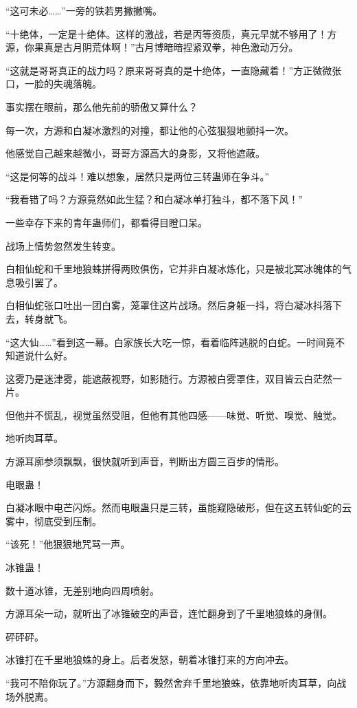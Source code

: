 \begin{this_body}
“这可未必……”一旁的铁若男撇撇嘴。

“十绝体，一定是十绝体。这样的激战，若是丙等资质，真元早就不够用了！方源，你果真是古月阴荒体啊！”古月博暗暗捏紧双拳，神色激动万分。

“这就是哥哥真正的战力吗？原来哥哥真的是十绝体，一直隐藏着！”方正微微张口，一脸的失魂落魄。

事实摆在眼前，那么他先前的骄傲又算什么？

每一次，方源和白凝冰激烈的对撞，都让他的心弦狠狠地颤抖一次。

他感觉自己越来越微小，哥哥方源高大的身影，又将他遮蔽。

“这是何等的战斗！难以想象，居然只是两位三转蛊师在争斗。”

“我看错了吗？方源竟然如此生猛？和白凝冰单打独斗，都不落下风！”

一些幸存下来的青年蛊师们，都看得目瞪口呆。

战场上情势忽然发生转变。

白相仙蛇和千里地狼蛛拼得两败俱伤，它并非白凝冰炼化，只是被北冥冰魄体的气息吸引罢了。

白相仙蛇张口吐出一团白雾，笼罩住这片战场。然后身躯一抖，将白凝冰抖落下去，转身就飞。

“这大仙……”看到这一幕。白家族长大吃一惊，看着临阵逃脱的白蛇。一时间竟不知道说什么好。

这雾乃是迷津雾，能遮蔽视野，如影随行。方源被白雾罩住，双目皆云白茫然一片。

但他并不慌乱，视觉虽然受阻，但他有其他四感——味觉、听觉、嗅觉、触觉。

地听肉耳草。

方源耳廓参须飘飘，很快就听到声音，判断出方圆三百步的情形。

电眼蛊！

白凝冰眼中电芒闪烁。然而电眼蛊只是三转，虽能窥隐破形，但在这五转仙蛇的云雾中，彻底受到压制。

“该死！”他狠狠地咒骂一声。

冰锥蛊！

数十道冰锥，无差别地向四周喷射。

方源耳朵一动，就听出了冰锥破空的声音，连忙翻身到了千里地狼蛛的身侧。

砰砰砰。

冰锥打在千里地狼蛛的身上。后者发怒，朝着冰锥打来的方向冲去。

“我可不陪你玩了。”方源翻身而下，毅然舍弃千里地狼蛛，依靠地听肉耳草，向战场外脱离。


\end{this_body}

